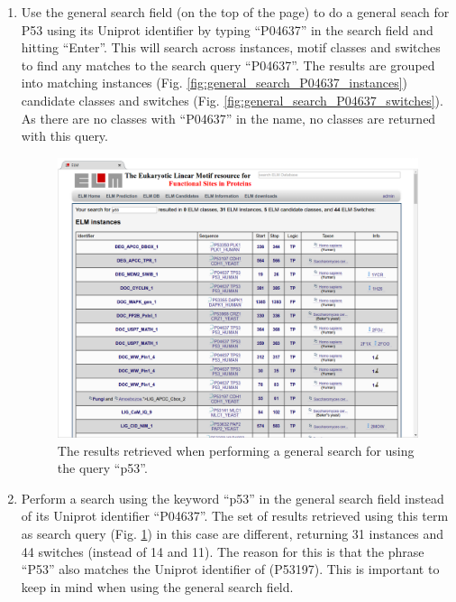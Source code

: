 \begin{enumerate}
\item Use the general search field (on the top of the page) to do a general
	seach for P53 using its Uniprot identifier by typing ``P04637'' in the
	search field and hitting ``Enter''. This will search
	across instances, motif classes and switches to find any matches to the
	search query ``P04637''. 
	The results are grouped into matching instances
	(Fig. \ref{fig:general_search_P04637_instances})
	candidate classes and switches
	(Fig. \ref{fig:general_search_P04637_switches}).
	As there are no classes with ``P04637'' in the name, no classes are
	returned with this query.


\begin{figure}[h!]
	\centering
	\includegraphics[width=\textwidth]{Figures/general_search/TP53_instances.png} 
	\caption{
		The results retrieved when performing a general search for
		 using the query ``p53''.
	}
	\label{fig:general_search_TP53_instances}
\end{figure}

\item Perform a search using the keyword ``p53'' in the general search field
	instead of its Uniprot identifier ``P04637''.
	The set of results retrieved using this term as search query
	(Fig. \ref{fig:general_search_TP53_instances})
	in this case are different, returning 31 instances and 44
	switches (instead of 14 and 11). The reason for this is that the
	phrase ``P53'' also matches the Uniprot identifier of
	 (P53197). This is important to keep in mind when
	using the general search field.

\end{enumerate}
